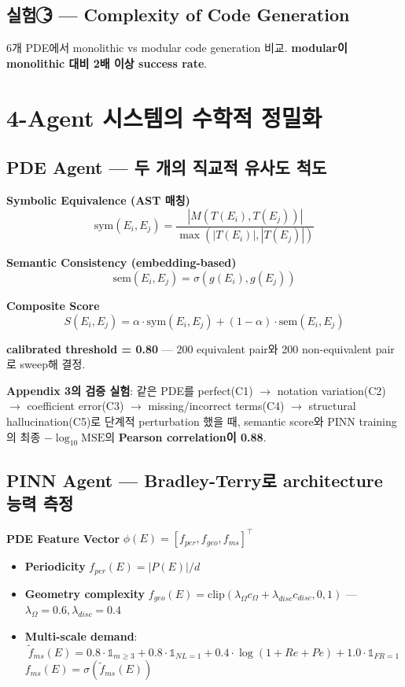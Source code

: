 \documentclass[11pt,a4paper,oneside]{report}
\begin{document}
\subsection{실험 \textcircled{3} --- Complexity of Code Generation}

6개 PDE에서 monolithic vs modular code generation 비교. \textbf{modular이 monolithic 대비 2배 이상 success rate}.

\section{4-Agent 시스템의 수학적 정밀화}

\subsection{PDE Agent --- 두 개의 직교적 유사도 척도}

\textbf{Symbolic Equivalence (AST 매칭)}
\[
\text{sym}(E_i, E_j) = \frac{|M(T(E_i), T(E_j))|}{\max(|T(E_i)|, |T(E_j)|)}
\]

\textbf{Semantic Consistency (embedding-based)}
\[
\text{sem}(E_i, E_j) = \sigma(g(E_i), g(E_j))
\]

\textbf{Composite Score}
\[
S(E_i, E_j) = \alpha \cdot \text{sym}(E_i, E_j) + (1-\alpha) \cdot \text{sem}(E_i, E_j)
\]

\textbf{calibrated threshold = 0.80} --- 200 equivalent pair와 200 non-equivalent pair로 sweep해 결정.

\textbf{Appendix 3의 검증 실험}: 같은 PDE를 perfect(C1) $\rightarrow$ notation variation(C2) $\rightarrow$ coefficient error(C3) $\rightarrow$ missing/incorrect terms(C4) $\rightarrow$ structural hallucination(C5)로 단계적 perturbation 했을 때, semantic score와 PINN training의 최종 $-\log_{10} \text{MSE}$의 \textbf{Pearson correlation이 0.88}.

\subsection{PINN Agent --- Bradley-Terry로 architecture 능력 측정}

\textbf{PDE Feature Vector} $\phi(E) = [f_{per}, f_{geo}, f_{ms}]^\top$
\begin{itemize}
\item \textbf{Periodicity} $f_{per}(E) = |P(E)|/d$
\item \textbf{Geometry complexity} $f_{geo}(E) = \text{clip}(\lambda_\Omega c_\Omega + \lambda_{disc} c_{disc}, 0, 1)$ --- $\lambda_\Omega=0.6, \lambda_{disc}=0.4$
\item \textbf{Multi-scale demand}:
\[
\tilde{f}_{ms}(E) = 0.8 \cdot \mathbb{1}_{m \geq 3} + 0.8 \cdot \mathbb{1}_{NL=1} + 0.4 \cdot \log(1 + Re + Pe) + 1.0 \cdot \mathbb{1}_{FR=1}
\]
$f_{ms}(E) = \sigma(\tilde{f}_{ms}(E))$
\end{itemize}
\end{document}
